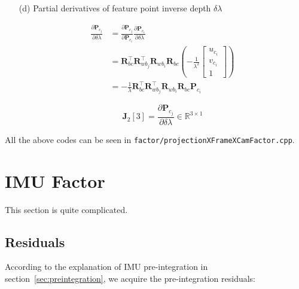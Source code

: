 \documentclass[12pt]{report}   %
\begin{document}
\begin{enumerate}
	\item[(d)] Partial derivatives of {\color{blue}feature point inverse depth $\delta \lambda$}
	
	\begin{equation}
	\begin{aligned} 
	\frac{\partial \mathbf{P}_{c_{j}}}{\partial \delta \lambda} 
	&=
	\frac{\partial \mathbf{P}_{c_{j}}}{\partial \mathbf{P}_{c_{i}}} 
	\frac{\partial \mathbf{P}_{c_{i}}}{\partial \delta \lambda} \\ 
	&=
	\mathbf{R}_{b c}^{\top} \mathbf{R}_{w b_{j}}^{\top} \mathbf{R}_{w b_{i}} \mathbf{R}_{b c}
	\left(-\frac{1}{\lambda^{2}}
	\left[\begin{array}{c}{u_{c_{i}}} \\ {v_{c_{i}}} \\ {1}\end{array}\right]\right) \\ 
	&=
	-\frac{1}{\lambda} \mathbf{R}_{b c}^{\top} \mathbf{R}_{w b_{j}}^{\top} \mathbf{R}_{w b_{i}} \mathbf{R}_{b c} \mathbf{P}_{c_{i}} 
	\end{aligned}
	\end{equation}
	
	\begin{equation}
	\mathbf{J}_2[3] =
	\frac{\partial \mathbf{P}_{c_{j}}}{\partial \delta \lambda}
	\in \mathbb{R}^{3 \times 1}
	\end{equation}
	
\end{enumerate}


All the above codes can be seen in \verb|factor/projectionXFrameXCamFactor.cpp|.

\section{IMU Factor}

This section is quite complicated. 

\subsection{Residuals}

According to the explanation of IMU pre-integration in section~\ref{sec:preintegration}, we acquire the pre-integration residuals:
\end{document}
